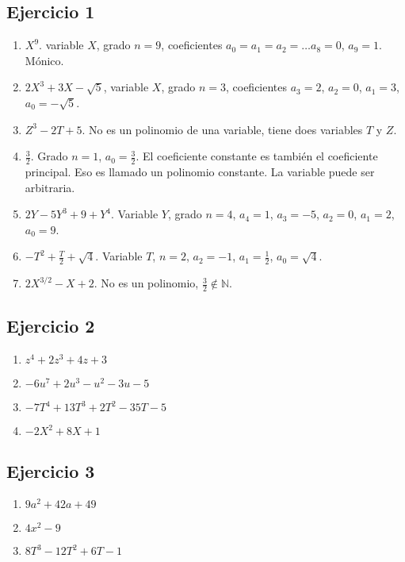 \subsection*{Ejercicio 1}

\begin{enumerate}
\item $X^9$. variable $X$, grado $n=9$, coeficientes $a_0 = a_1 = a_2 = \ldots a_8 = 0$, $a_9 = 1$. Mónico.
\item $2 X^3 + 3X - \sqrt{5}$, variable $X$, grado $n=3$, coeficientes  $a_3 = 2$, $a_2 = 0$, $a_1 = 3$, $a_0 = -\sqrt{5}$.
\item $Z^3 - 2T + 5$. No es un polinomio de una variable, tiene does variables
  $T$ y $Z$.
\item $\frac{3}{2}$. Grado $n=1$, $a_0 = \frac{3}{2}$. El coeficiente constante es también el coeficiente principal. Eso es llamado un polinomio constante. La
  variable puede ser arbitraria.
\item $2Y - 5Y^3 + 9 + Y^4$. Variable $Y$, grado $n=4$, $a_4 = 1$, $a_3=-5$, $a_2=0$, $a_1=2$, $a_0=9$.
\item $-T^2 + \frac{T}{2} + \sqrt{4}$. Variable $T$, $n=2$, $a_2 = -1$, $a_1 = \frac{1}{2}$, $a_0 = \sqrt{4}$.
\item $2 X^{3/2} - X + 2$. No es un polinomio, $\frac{3}{2} \notin \mathbb N$.
\end{enumerate}

\subsection*{Ejercicio 2}

\begin{enumerate}
\item $z^4 + 2z^3 + 4z + 3$
\item $-6u^7 + 2u^3 -u^2 - 3u - 5$
\item $-7T^4 + 13T^3 + 2T^2 -35T -5$
\item $-2X^2 + 8X + 1$
\end{enumerate}

\subsection*{Ejercicio 3}

\begin{enumerate}
\item $9a^2 + 42a + 49$
\item $4x^2-9$
\item $8T^3-12T^2+6T-1$
\end{enumerate}

